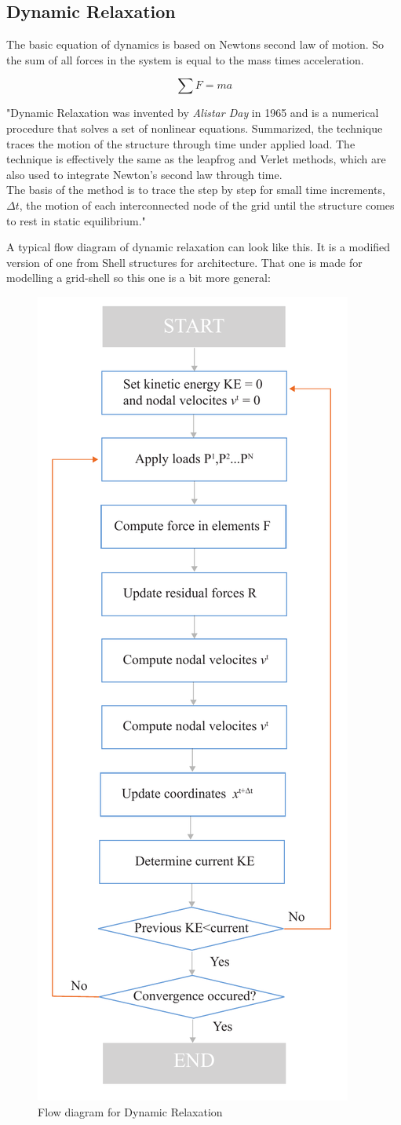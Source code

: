 \subsection{Dynamic Relaxation}

The basic equation of dynamics is based on Newtons second law of motion. So the sum of all forces in the system is equal to the mass times acceleration.

\begin{equation}
\sum F = ma
\end{equation}

"Dynamic Relaxation was invented by \textit{ Alistar Day} in 1965 and is a numerical procedure that solves a set of nonlinear equations. Summarized, the technique traces the motion of the structure through time under applied load. The technique is effectively the same as the leapfrog and Verlet methods, which are also used to integrate Newton's second law through time.\\
The basis of the method is to trace the step by step for small time increments, $\Delta t$, the motion of each interconnected node of the grid until the structure comes to rest in static equilibrium."

A typical flow diagram of dynamic relaxation can look like this. It is a modified version of one from Shell structures for architecture. That one is made for modelling a grid-shell so this one is a bit more general:

\begin{figure}[H]
\centering
\includegraphics[height=1.2\linewidth ]{figure/Theory/DRScheme.pdf}
\caption{Flow diagram for Dynamic Relaxation }
\end{figure}

